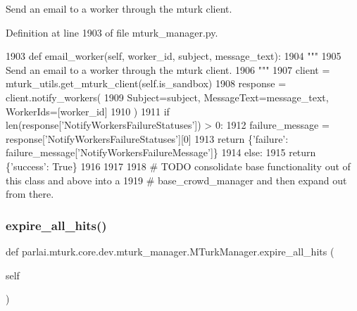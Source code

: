 \begin{DoxyVerb}Send an email to a worker through the mturk client.
\end{DoxyVerb}
 

Definition at line 1903 of file mturk\+\_\+manager.\+py.


\begin{DoxyCode}
1903     \textcolor{keyword}{def }email\_worker(self, worker\_id, subject, message\_text):
1904         \textcolor{stringliteral}{"""}
1905 \textcolor{stringliteral}{        Send an email to a worker through the mturk client.}
1906 \textcolor{stringliteral}{        """}
1907         client = mturk\_utils.get\_mturk\_client(self.is\_sandbox)
1908         response = client.notify\_workers(
1909             Subject=subject, MessageText=message\_text, WorkerIds=[worker\_id]
1910         )
1911         \textcolor{keywordflow}{if} len(response[\textcolor{stringliteral}{'NotifyWorkersFailureStatuses'}]) > 0:
1912             failure\_message = response[\textcolor{stringliteral}{'NotifyWorkersFailureStatuses'}][0]
1913             \textcolor{keywordflow}{return} \{\textcolor{stringliteral}{'failure'}: failure\_message[\textcolor{stringliteral}{'NotifyWorkersFailureMessage'}]\}
1914         \textcolor{keywordflow}{else}:
1915             \textcolor{keywordflow}{return} \{\textcolor{stringliteral}{'success'}: \textcolor{keyword}{True}\}
1916 
1917 
1918 \textcolor{comment}{# TODO consolidate base functionality out of this class and above into a}
1919 \textcolor{comment}{# base\_crowd\_manager and then expand out from there.}
\end{DoxyCode}
\mbox{\label{classparlai_1_1mturk_1_1core_1_1dev_1_1mturk__manager_1_1MTurkManager_adfea3bed271a071333c873d3f7c8fb8b}} 
\subsubsection{\texorpdfstring{expire\+\_\+all\+\_\+hits()}{expire\_all\_hits()}}
{\footnotesize\ttfamily def parlai.\+mturk.\+core.\+dev.\+mturk\+\_\+manager.\+M\+Turk\+Manager.\+expire\+\_\+all\+\_\+hits (\begin{DoxyParamCaption}\item[{}]{self }\end{DoxyParamCaption})}

